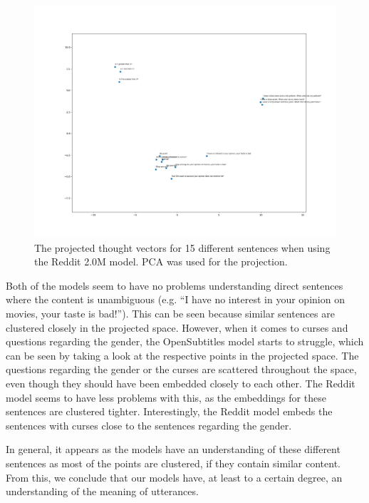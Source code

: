 \begin{figure}[h]
	\centering
	\includegraphics[width=14cm]{img/reddit_thought_vector_embeddings.png}
	\caption{The projected thought vectors for 15 different sentences when using the Reddit 2.0M model. PCA was used for the projection.}
	\label{results:thougth_vectors:embeddings:reddit}
\end{figure}

Both of the models seem to have no problems understanding direct sentences where the content is unambiguous (e.g. ``I have no interest in your opinion on movies, your taste is bad!''). This can be seen because similar sentences are clustered closely in the projected space. However, when it comes to curses and questions regarding the gender, the OpenSubtitles model starts to struggle, which can be seen by taking a look at the respective points in the projected space. The questions regarding the gender or the curses are scattered throughout the space, even though they should have been embedded closely to each other. The Reddit model seems to have less problems with this, as the embeddings for these sentences are clustered tighter. Interestingly, the Reddit model embeds the sentences with curses close to the sentences regarding the gender.

In general, it appears as the models have an understanding of these different sentences as most of the points are clustered, if they contain similar content. From this, we conclude that our models have, at least to a certain degree, an understanding of the meaning of utterances.


